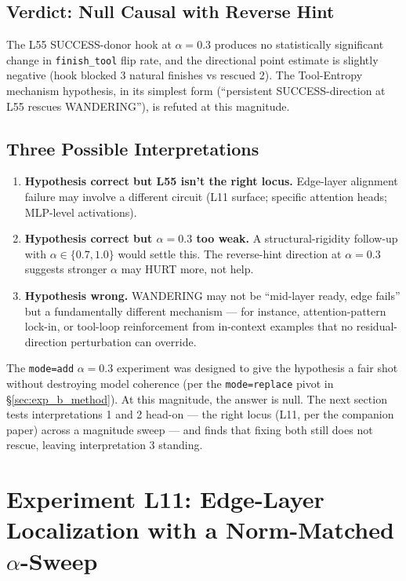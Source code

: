 \documentclass[11pt]{article}
\begin{document}
\subsection{Verdict: Null Causal with Reverse Hint}

The L55 SUCCESS-donor hook at $\alpha=0.3$ produces no statistically significant change in \texttt{finish\_tool} flip rate, and the directional point estimate is slightly negative (hook blocked 3 natural finishes vs rescued 2). The Tool-Entropy mechanism hypothesis, in its simplest form (``persistent SUCCESS-direction at L55 rescues WANDERING''), is refuted at this magnitude.

\subsection{Three Possible Interpretations}

\begin{enumerate}
\item \textbf{Hypothesis correct but L55 isn't the right locus.} Edge-layer alignment failure may involve a different circuit (L11 surface; specific attention heads; MLP-level activations).
\item \textbf{Hypothesis correct but $\alpha=0.3$ too weak.} A structural-rigidity follow-up with $\alpha \in \{0.7, 1.0\}$ would settle this. The reverse-hint direction at $\alpha=0.3$ suggests stronger $\alpha$ may HURT more, not help.
\item \textbf{Hypothesis wrong.} WANDERING may not be ``mid-layer ready, edge fails'' but a fundamentally different mechanism --- for instance, attention-pattern lock-in, or tool-loop reinforcement from in-context examples that no residual-direction perturbation can override.
\end{enumerate}

The \texttt{mode=add} $\alpha=0.3$ experiment was designed to give the hypothesis a fair shot without destroying model coherence (per the \texttt{mode=replace} pivot in \S\ref{sec:exp_b_method}). At this magnitude, the answer is null. The next section tests interpretations 1 and 2 head-on --- the right locus (L11, per the companion paper) across a magnitude sweep --- and finds that fixing both still does not rescue, leaving interpretation 3 standing.

\section{Experiment L11: Edge-Layer Localization with a Norm-Matched $\alpha$-Sweep}\label{sec:exp_l11}
\end{document}
